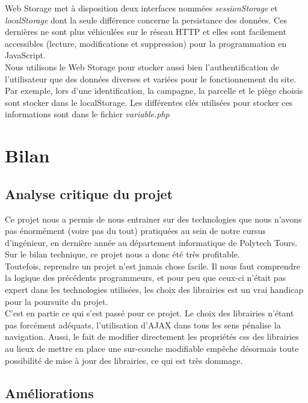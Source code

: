 \documentclass[twoside]{EPURapport}
\begin{document}
		Web Storage met à disposition deux interfaces nommées \emph{sessionStorage} et \emph{localStorage} dont la seule différence concerne la persistance des données. Ces dernières ne sont plus véhiculées sur le réseau HTTP et elles sont facilement accessibles (lecture, modifications et suppression) pour la programmation en JavaScript.\\
		
		Nous utilisons le Web Storage pour stocker aussi bien l'authentification de l'utilisateur que des données diverses et variées pour le fonctionnement du site. Par exemple, lors d'une identification, la campagne, la parcelle et le piège choisis sont stocker dans le localStorage. Les différentes clés utilisées pour stocker ces informations sont dans le fichier \emph{variable.php}

\chapter{Bilan}

	\section{Analyse critique du projet}
	
	Ce projet nous a permis de nous entrainer sur des technologies que nous n'avons pas énormément (voire pas du tout) pratiquées au sein de notre cursus d'ingénieur, en dernière année au département informatique de Polytech Tours. Sur le bilan technique, ce projet nous a donc été très profitable.\\
	
	Toutefois, reprendre un projet n'est jamais chose facile. Il nous faut comprendre la logique des précédents programmeurs, et pour peu que ceux-ci n'était pas expert dans les technologies utilisées, les choix des librairies est un vrai handicap pour la poursuite du projet.\\
	
	C'est en partie ce qui s'est passé pour ce projet. Le choix des librairies n'étant pas forcément adéquats, l'utilisation d'AJAX dans tous les sens pénalise la navigation. Aussi, le fait de modifier directement les propriétés css des librairies au lieux de mettre en place une sur-couche modifiable empêche désormais toute possibilité de mise à jour des librairies, ce qui est très dommage.
	
	\section{Améliorations}
	
\end{document}
